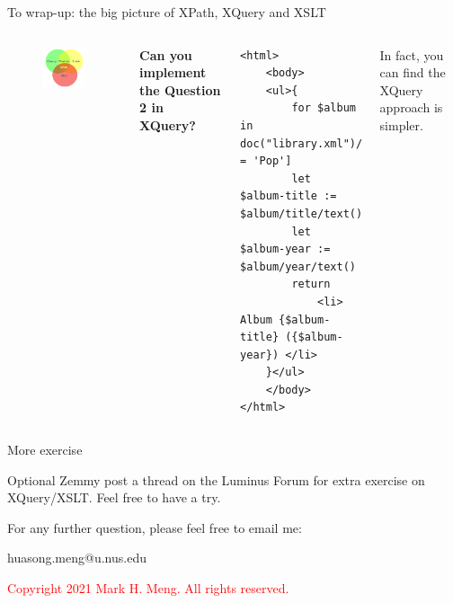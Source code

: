 \begin{frame}[fragile]{To wrap-up: the big picture of XPath, XQuery and XSLT}
\begin{columns}

\begin{figure}
	\includegraphics[width=1\textwidth]{4221-t8/what-small.png}
\end{figure}\vspace{5pt}


\textbf{Can you implement the Question 2 in XQuery?}\\\vspace{5pt}
\begin{lstlisting}[style=xml-small-nomargin]
<html>
	<body>
	<ul>{
		for $album in doc("library.xml")//album[genres/genre = 'Pop']
		let $album-title := $album/title/text()
		let $album-year := $album/year/text()
		return
			<li> Album {$album-title} ({$album-year}) </li>
	}</ul>
	</body>
</html>
\end{lstlisting}
In fact, you can find the XQuery approach is simpler.
\end{columns}
\end{frame}

\begin{frame}[fragile]{More exercise}
	
\begin{block}{Optional}
Zemmy post a thread on the Luminus Forum for extra exercise on XQuery/XSLT. Feel free to have a try.
\end{block}

\end{frame}

\begin{frame}{}
	\centering  
	For any further question, please feel free to email me:\vspace{10pt}
	
	huasong.meng@u.nus.edu \vspace{20pt}
	
	\begin{tcolorbox}
		\begin{center}
			\textcolor{red}{Copyright 2021 Mark H. Meng. All rights reserved.}
		\end{center}
	\end{tcolorbox}
\end{frame}